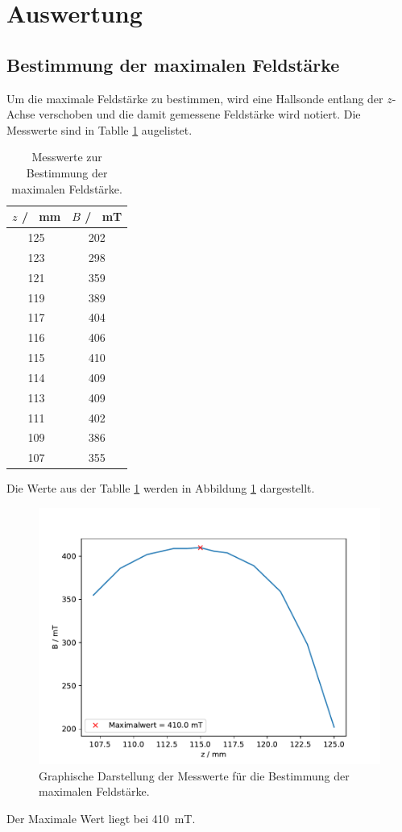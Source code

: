 \section{Auswertung}
\label{sec:Auswertung}
\subsection{Bestimmung der maximalen Feldstärke}
Um die maximale Feldstärke zu bestimmen, wird eine Hallsonde entlang der $z$-Achse verschoben und die damit gemessene 
Feldstärke wird notiert.
Die Messwerte sind in Tablle \ref{tab:Feldstärke} augelistet.
\FloatBarrier
\begin{table}
  \centering
  \begin{tabular}{c c}
    \toprule
    $z$ / \SI{}{\milli\meter}& $B$ / \SI{}{\milli\tesla}\\
    \midrule
    125& 202\\     
    123& 298\\
    121& 359\\
    119& 389\\
    117& 404\\
    116& 406\\
    115& 410\\
    114& 409\\
    113& 409\\
    111& 402\\
    109& 386\\
    107& 355\\
    \bottomrule
  \end{tabular}
  \caption{Messwerte zur Bestimmung der maximalen Feldstärke.}
  \label{tab:Feldstärke}
\end{table}
\FloatBarrier
Die Werte aus der Tablle \ref{tab:Feldstärke} werden in Abbildung \ref{fig:Feldstärke} dargestellt.
\FloatBarrier
\begin{figure}
  \centering
  \includegraphics[width = \textwidth, keepaspectratio]{figure/BFeld_plot.pdf}
  \caption{Graphische Darstellung der Messwerte für die Bestimmung der maximalen Feldstärke.}
  \label{fig:Feldstärke}
\end{figure}
\FloatBarrier
Der Maximale Wert liegt bei \SI{410}{\milli\tesla}. 
